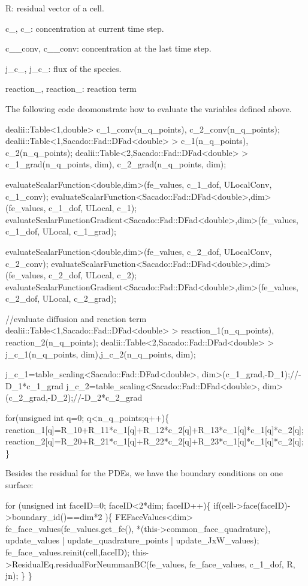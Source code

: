 R\-: residual vector of a cell.

c\-\_, c\-\_\-: concentration at current time step.

c\-\_\-\_\-conv, c\-\_\-\_\-conv\-: concentration at the last time step.

j\-\_\-c\-\_, j\-\_\-c\-\_\-: flux of the species.

reaction\-\_, reaction\-\_\-: reaction term 

 The following code deomonstrate how to evaluate the variables defined above. 
\begin{DoxyCode}
dealii::Table<1,double>  c\_1\_conv(n\_q\_points), c\_2\_conv(n\_q\_points);
dealii::Table<1,Sacado::Fad::DFad<double> > c\_1(n\_q\_points), c\_2(n\_q\_points);
dealii::Table<2,Sacado::Fad::DFad<double> >  c\_1\_grad(n\_q\_points, dim), c\_2\_grad(n\_q\_points, dim);

evaluateScalarFunction<double,dim>(fe\_values, c\_1\_dof, ULocalConv, c\_1\_conv);
evaluateScalarFunction<Sacado::Fad::DFad<double>,dim>(fe\_values, c\_1\_dof, ULocal, c\_1); 
evaluateScalarFunctionGradient<Sacado::Fad::DFad<double>,dim>(fe\_values, c\_1\_dof, ULocal, c\_1\_grad);

evaluateScalarFunction<double,dim>(fe\_values, c\_2\_dof, ULocalConv, c\_2\_conv);
evaluateScalarFunction<Sacado::Fad::DFad<double>,dim>(fe\_values, c\_2\_dof, ULocal, c\_2); 
evaluateScalarFunctionGradient<Sacado::Fad::DFad<double>,dim>(fe\_values, c\_2\_dof, ULocal, c\_2\_grad);


\textcolor{comment}{//evaluate diffusion and reaction term}
dealii::Table<1,Sacado::Fad::DFad<double> > reaction\_1(n\_q\_points), reaction\_2(n\_q\_points);
dealii::Table<2,Sacado::Fad::DFad<double> > j\_c\_1(n\_q\_points, dim),j\_c\_2(n\_q\_points, dim);

j\_c\_1=table\_scaling<Sacado::Fad::DFad<double>, dim>(c\_1\_grad,-D\_1);\textcolor{comment}{//-D\_1*c\_1\_grad}
j\_c\_2=table\_scaling<Sacado::Fad::DFad<double>, dim>(c\_2\_grad,-D\_2);\textcolor{comment}{//-D\_2*c\_2\_grad}

\textcolor{keywordflow}{for}(\textcolor{keywordtype}{unsigned} \textcolor{keywordtype}{int} q=0; q<n\_q\_points;q++)\{
    reaction\_1[q]=R\_10+R\_11*c\_1[q]+R\_12*c\_2[q]+R\_13*c\_1[q]*c\_1[q]*c\_2[q];
    reaction\_2[q]=R\_20+R\_21*c\_1[q]+R\_22*c\_2[q]+R\_23*c\_1[q]*c\_1[q]*c\_2[q];
\}
\end{DoxyCode}
 Besides the residual for the P\-D\-Es, we have the boundary conditions on one surface\-: 
\begin{DoxyCode}
\textcolor{keywordflow}{for} (\textcolor{keywordtype}{unsigned} \textcolor{keywordtype}{int} faceID=0; faceID<2*dim; faceID++)\{
    \textcolor{keywordflow}{if}(cell->face(faceID)->boundary\_id()==dim*2 )\{
      FEFaceValues<dim> fe\_face\_values(fe\_values.get\_fe(), *(this->common\_face\_quadrature), update\_values |
       update\_quadrature\_points | update\_JxW\_values);
        fe\_face\_values.reinit(cell,faceID);
        this->ResidualEq.residualForNeummanBC(fe\_values, fe\_face\_values, c\_1\_dof, R, jn);
    \}
\}
\end{DoxyCode}
